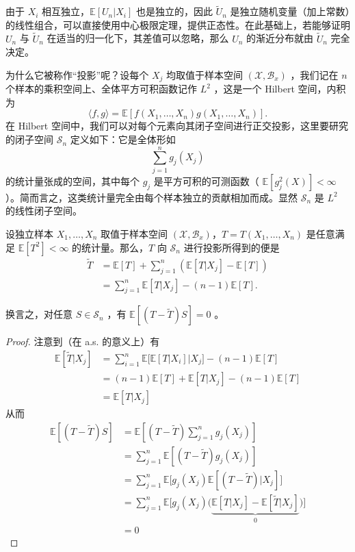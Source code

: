 由于 $X_i$ 相互独立，$\mathbb{E}[U_n| X_i]$ 也是独立的，因此 $\widetilde{U}_n$ 是独立随机变量（加上常数）的线性组合，可以直接使用中心极限定理，提供正态性。在此基础上，若能够证明 $U_n$ 与 $\widetilde{U}_n$ 在适当的归一化下，其差值可以忽略，那么 $U_n$ 的渐近分布就由 $\widetilde{U}_n$ 完全决定。

为什么它被称作``投影''呢？设每个 $X_j$ 均取值于样本空间 $(\mathscr X,\mathscr B_x)$ ，我们记在 $n$ 个样本的乘积空间上、全体平方可积函数记作 $L^2$ ，这是一个 Hilbert 空间，内积为
\[
\langle f,g\rangle
=\mathbb E[f(X_1,\dots,X_n)g(X_1,\dots,X_n)].
\]
在 Hilbert 空间中，我们可以对每个元素向其闭子空间进行正交投影，这里要研究的闭子空间 $\mathscr S_n$ 定义如下：它是全体形如
\[\sum_{j=1}^ng_j(X_j)\]
的统计量张成的空间，其中每个 $g_j$ 是平方可积的可测函数（ $\mathbb E[g_j^2(X)]<\infty$ ）。简而言之，这类统计量完全由每个样本独立的贡献相加而成。显然 $\mathscr S_n$ 是 $L^2$ 的线性闭子空间。

\begin{lemma}[Hájek 投影]\label{lem:ch10:hajek-projection}

设独立样本 $X_1,\dots,X_n$ 取值于样本空间 $(\mathscr X,\mathscr B_x)$，$T=T(X_1,\dots,X_n)$ 是任意满足 $\mathbb E[T^2]<\infty$ 的统计量。那么，$T$ 向 $\mathscr S_n$ 进行投影所得到的便是
\[
\begin{aligned}
\widetilde T
&=\mathbb E[T]+\sum_{j=1}^n(\mathbb E[T|X_j]-\mathbb E[T])\\
&=\sum_{j=1}^n\mathbb E[T|X_j]-(n-1)\mathbb E[T].
\end{aligned}
\]

换言之，对任意 $S\in\mathscr S_n$ ，有 $\mathbb E[(T-\widetilde T)S]=0$ 。

\end{lemma}

\begin{proof}

注意到（在 a.s. 的意义上）有
\[\begin{aligned} \mathbb E[\widetilde T|X_j]&=\sum_{i=1}^n\mathbb E\Big[\mathbb E[T|X_i]\Big|X_j\Big]-(n-1)\mathbb E[T]\\ &=(n-1)\mathbb E[T]+\mathbb E[T|X_j]-(n-1)\mathbb E[T]\\ &=\mathbb E[T|X_j] \end{aligned}\]
从而
\[\begin{aligned} \mathbb E[(T-\widetilde T)S]&=\mathbb E\left[(T-\widetilde T)\sum_{j=1}^ng_j(X_j)\right]\\ &=\sum_{j=1}^n\mathbb E[(T-\widetilde T)g_j(X_j)]\\ &=\sum_{j=1}^n\mathbb E\big[g_j(X_j)\mathbb E[(T-\widetilde T)|X_j]\big]\\ &=\sum_{j=1}^n\mathbb E\Big[g_j(X_j)\big(\underbrace{\mathbb E[T|X_j]-\mathbb E[\widetilde T|X_j]}_{0}\big)\Big]\\ &=0 \end{aligned}\]
\end{proof}

